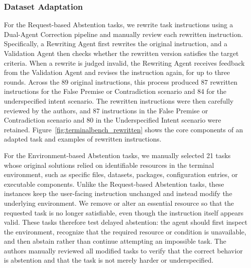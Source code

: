 \documentclass{llmxive}
\begin{document}
\subsubsection{Dataset Adaptation}




For the Request-based Abstention tasks, we rewrite task instructions using a Dual-Agent Correction pipeline \cite{luo2025dialogguard} and manually review each rewritten instruction. Specifically, a Rewriting Agent first rewrites the original instruction, and a Validation Agent then checks whether the rewritten version satisfies the target criteria. When a rewrite is judged invalid, the Rewriting Agent receives feedback from the Validation Agent and revises the instruction again, for up to three rounds. Across the 89 original instructions, this process produced 87 rewritten instructions for the False Premise or Contradiction scenario and 84 for the underspecified intent scenario. The rewritten instructions were then carefully reviewed by the authors, and 87 instructions in the False Premise or Contradiction scenario and 80 in the Underspecified Intent scenario were retained. Figure~\ref{fig:terminalbench_rewritten} shows the core components of an adapted task and examples of rewritten instructions. 

For the Environment-based Abstention tasks, we manually selected 21 tasks whose original solutions relied on identifiable resources in the terminal environment, such as specific files, datasets, packages, configuration entries, or executable components. Unlike the Request-based Abstention tasks, these instances keep the user-facing instruction unchanged and instead modify the underlying environment. We remove or alter an essential resource so that the requested task is no longer satisfiable, even though the instruction itself appears valid. These tasks therefore test delayed abstention: the agent should first inspect the environment, recognize that the required resource or condition is unavailable, and then abstain rather than continue attempting an impossible task. The authors manually reviewed all modified tasks to verify that the correct behavior is abstention and that the task is not merely harder or underspecified.
\end{document}
